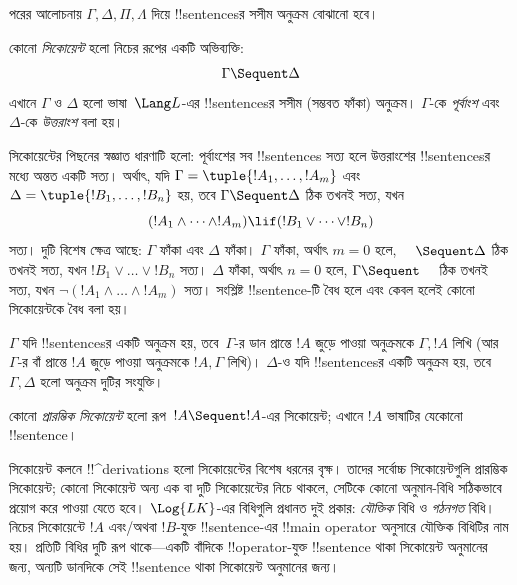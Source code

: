 \documentclass[../../../include/open-logic-section]{subfiles}
\begin{document}
      {}
      {}


পরের আলোচনায় $\Gamma, \Delta, \Pi, \Lambda$ দিয়ে !!{sentence}sর
সসীম অনুক্রম বোঝানো হবে।

\begin{defn}[সিকোয়েন্ট]
কোনো \emph{সিকোয়েন্ট} হলো নিচের রূপের একটি অভিব্যক্তি:
\[
\Gamma \Sequent \Delta
\]
এখানে $\Gamma$ ও $\Delta$ হলো ভাষা~$\Lang L$-এর !!{sentence}sর
সসীম (সম্ভবত ফাঁকা) অনুক্রম। $\Gamma$-কে \emph{পূর্বাংশ} এবং
$\Delta$-কে \emph{উত্তরাংশ} বলা হয়।
\end{defn}

\begin{explain}
সিকোয়েন্টের পিছনের স্বজ্ঞাত ধারণাটি হলো: পূর্বাংশের সব !!{sentence}s
সত্য হলে উত্তরাংশের !!{sentence}sর মধ্যে অন্তত একটি সত্য। অর্থাৎ, যদি
$\Gamma = \tuple{!A_1, \dots, !A_m}$ এবং
$\Delta = \tuple{!B_1, \dots, !B_n}$ হয়, তবে $\Gamma \Sequent \Delta$
ঠিক তখনই সত্য, যখন
\[
(!A_1 \land \cdots \land !A_m) \lif (!B_1 \lor \cdots \lor
!B_n)
\]
সত্য। দুটি বিশেষ ক্ষেত্র আছে: $\Gamma$ ফাঁকা এবং $\Delta$ ফাঁকা।
$\Gamma$ ফাঁকা, অর্থাৎ $m = 0$ হলে, $\quad
\Sequent \Delta$ ঠিক তখনই সত্য, যখন $!B_1 \lor \dots \lor !B_n$
সত্য। $\Delta$ ফাঁকা, অর্থাৎ $n = 0$ হলে, $\Gamma \Sequent \quad$
ঠিক তখনই সত্য, যখন $\lnot(!A_1 \land \dots \land !A_m)$ সত্য।
সংশ্লিষ্ট !!{sentence}-টি বৈধ হলে এবং কেবল হলেই কোনো সিকোয়েন্টকে
বৈধ বলা হয়।
\end{explain}

$\Gamma$ যদি !!{sentence}sর একটি অনুক্রম হয়, তবে~$\Gamma$-র ডান
প্রান্তে $!A$ জুড়ে পাওয়া অনুক্রমকে $\Gamma, !A$ লিখি (আর~$\Gamma$-র বাঁ প্রান্তে
$!A$ জুড়ে পাওয়া অনুক্রমকে $!A, \Gamma$ লিখি)। $\Delta$-ও যদি
!!{sentence}sর একটি অনুক্রম হয়, তবে $\Gamma, \Delta$ হলো অনুক্রম
দুটির সংযুক্তি।

\begin{defn}[প্রারম্ভিক সিকোয়েন্ট]
কোনো \emph{প্রারম্ভিক সিকোয়েন্ট} হলো
{রূপ~$!A \Sequent !A$-এর সিকোয়েন্ট}; এখানে $!A$ ভাষাটির যেকোনো
!!{sentence}।
\end{defn}

সিকোয়েন্ট কলনে !!^{derivation}s হলো সিকোয়েন্টের বিশেষ ধরনের বৃক্ষ।
তাদের সর্বোচ্চ সিকোয়েন্টগুলি প্রারম্ভিক সিকোয়েন্ট; কোনো সিকোয়েন্ট
অন্য এক বা দুটি সিকোয়েন্টের নিচে থাকলে, সেটিকে কোনো অনুমান-বিধি
সঠিকভাবে প্রয়োগ করে পাওয়া যেতে হবে। $\Log{LK}$-এর বিধিগুলি প্রধানত দুই প্রকার:
\emph{যৌক্তিক} বিধি ও \emph{গঠনগত} বিধি। নিচের সিকোয়েন্টে $!A$ এবং/অথবা
$!B$-যুক্ত !!{sentence}-এর !!{main operator} অনুসারে যৌক্তিক বিধিটির
নাম হয়। প্রতিটি বিধির দুটি রূপ থাকে—একটি বাঁদিকে !!{operator}-যুক্ত
!!{sentence} থাকা সিকোয়েন্ট অনুমানের জন্য, অন্যটি ডানদিকে সেই
!!{sentence} থাকা সিকোয়েন্ট অনুমানের জন্য।
\end{document}
